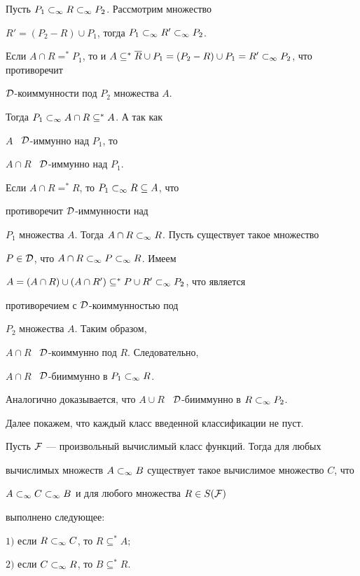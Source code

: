 \begin{pf}


Пусть ${P_1}\subset_\infty{{R}\subset_\infty{P_2}}$. Рассмотрим множество


$R'=(P_2-R)\cup P_1$, тогда ${P_1}\subset_\infty{{R'}\subset_\infty{P_2}}$.


Если $A\cap R=^*P_1$, то и $A\subseteq^*\overline{R}


\cup P_1=(P_2-R)\cup P_1=\sub{R'}{P_2}$, что противоречит


$\cal{D}$-коиммунности под $P_2$ множества $A$.


Тогда ${P_1}\subset_\infty{A\cap R\subseteq^*A}$. А так как


$A$ \ $\cal{D}$-иммунно над $P_1$, то


$A\cap R$ \ $\cal{D}$-иммунно над $P_1$.





Если $A\cap R=^*R$, то ${P_1}\subset_\infty{R}\subseteq A$, что


противоречит $\cal{D}$-иммунности над


$P_1$ множества $A$. Тогда ${A\cap R}\subset_\infty{R}$. Пусть существует такое множество


$P\in\cal{D}$, что ${A\cap R}\subset_\infty{{P}\subset_\infty{R}}$. Имеем


$A=(A\cap R)\cup(A\cap R')\subseteq^*{P\cup R'}\subset_\infty{P_2}$, что является


противоречием с $\cal{D}$-коиммунностью под


$P_2$ множества $A$. Таким образом,


$A\cap R$ \ $\cal{D}$-коиммунно под $R$. Следовательно,


$A\cap R$ \ $\cal{D}$-бииммунно в ${P_1}\subset_\infty{R}$.





Аналогично доказывается, что $A\cup R$ \ $\cal{D}$-бииммунно в ${R}\subset_\infty{P_2}$.


\end{pf}





Далее покажем, что каждый класс введенной классификации не пуст.





\begin{thm}\label{th1-2}


Пусть $\cal{F}$ --- произвольный вычислимый класс функций. Тогда для любых


вычислимых множеств ${A}\subset_\infty{B}$ существует такое вычислимое множество $C$, что


${A}\subset_\infty{{C}\subset_\infty{B}}$ и для любого множества $R\in S(\cal{F})$ 


выполнено следующее\/${:}$





$1)$ если ${R}\subset_\infty{C}$, то $R\subseteq^*A;$





$2)$ если ${C}\subset_\infty{R}$, то $B\subseteq^*R$.


\end{thm}








